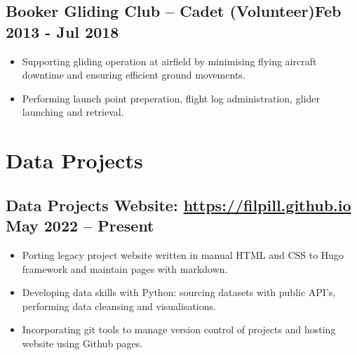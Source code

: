 \documentclass[a4paper,9pt]{article}
\begin{document}
\subsection*{\textbf{Booker Gliding Club – Cadet (Volunteer)}\hfill Feb 2013 - Jul 2018}
\begin{itemize}[noitemsep]

	\item Supporting gliding operation at airfield by minimising flying aircraft downtime and ensuring efficient ground movements.
	\item Performing launch point preperation, flight log administration, glider launching and retrieval.

\end{itemize}


\section*{Data Projects}

\subsection*{\textbf{Data Projects Website}: \url{https://filpill.github.io} \hfill  May 2022 – Present}
\begin{itemize}[noitemsep]

	\item  Porting legacy project website written in manual HTML and CSS to Hugo framework and maintain pages with markdown.
	\item  Developing data skills with Python: sourcing datasets with public API's, performing data cleansing and visualisations.
	\item  Incorporating git tools to manage version control of projects and hosting website using Github pages.

\end{itemize}

%
%
\end{document}
